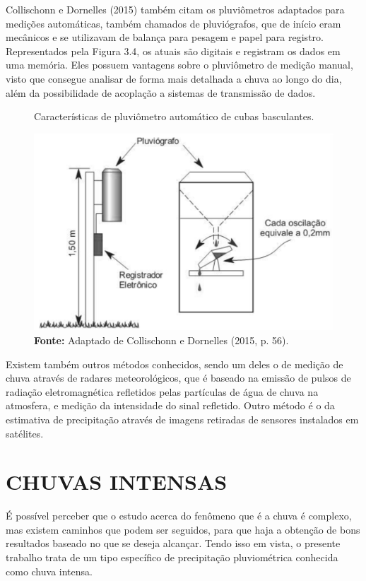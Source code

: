 Collischonn e Dornelles (2015) também citam os pluviômetros adaptados para medições automáticas, também chamados de pluviógrafos, que de início eram mecânicos e se utilizavam de balança para pesagem e papel para registro. Representados pela Figura 3.4, os atuais são digitais e registram os dados em uma memória. Eles possuem vantagens sobre o pluviômetro de medição manual, visto que consegue analisar de forma mais detalhada a chuva ao longo do dia, além da possibilidade de acoplação a sistemas de transmissão de dados.\bigskip

\begin{figure}[!ht]
	\centering
	\caption{Características de pluviômetro automático de cubas basculantes.}
	\includegraphics[width=.7625\linewidth]{figuras/caracteristicas_de_um_pluviometro_de_leitura_automatica_baseado_no_mecanismo_de_cubas_basculantes.png}
	\caption*{\textbf{Fonte:} Adaptado de Collischonn e Dornelles (2015, p. 56).}
	\label{fig:caracteristicas_de_um_pluviometro_de_leitura_automatica_baseado_no_mecanismo_de_cubas_basculantes.png}
\end{figure}

\newpage

Existem também outros métodos conhecidos, sendo um deles o de medição de chuva através de radares meteorológicos, que é baseado na emissão de pulsos de radiação eletromagnética refletidos pelas partículas de água de chuva na atmosfera, e medição da intensidade do sinal refletido. Outro método é o da estimativa de precipitação através de imagens retiradas de sensores instalados em satélites.

\section{CHUVAS INTENSAS}

É possível perceber que o estudo acerca do fenômeno que é a chuva é complexo, mas existem caminhos que podem ser seguidos, para que haja a obtenção de bons resultados baseado no que se deseja alcançar. Tendo isso em vista, o presente trabalho trata de um tipo específico de precipitação pluviométrica conhecida como chuva intensa.

